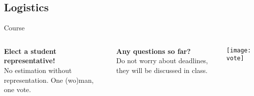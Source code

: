 \documentclass[t]{beamer}
\begin{document}

  \subsection{Logistics}

  \begin{frame}[t]{Course }

    \begin{columns}[T]


        \textbf{Elect a student representative!}\\[1em]

        No estimation without representation. One (wo)man, one vote.\vspace{1em}

        \textbf{Any questions so far?}\\[1em]

        Do not worry about deadlines, they will be discussed in class.


        \texttt{[image: vote]}

    \end{columns}

  \end{frame}
\end{document}
